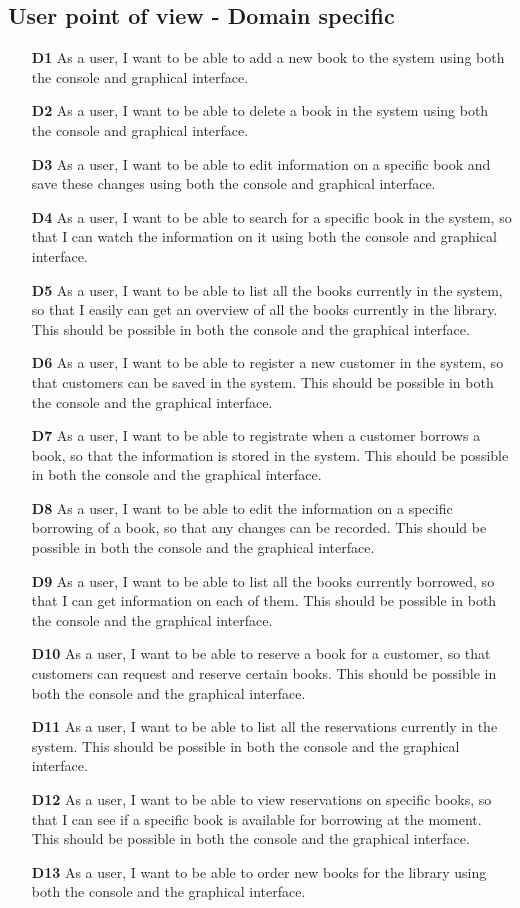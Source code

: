 \subsection*{User point of view - Domain specific}
\begin{itemize}
  \item [\textbf{D1}] As a user, I want to be able to add a new book to the system using both the console and graphical interface.
  \item [\textbf{D2}] As a user, I want to be able to delete a book in the system using both the console and graphical interface.
  \item [\textbf{D3}] As a user, I want to be able to edit information on a specific book and save these changes using both the console and graphical interface.
  \item [\textbf{D4}] As a user, I want to be able to search for a specific book in the system, so that I can watch the information on it using both the console and graphical interface.
  \item [\textbf{D5}] As a user, I want to be able to list all the books currently in the system, so that I easily can get an overview of all the books currently in the library. This should be possible in both the console and the graphical interface.
  \item [\textbf{D6}] As a user, I want to be able to register a new customer in the system, so that customers can be saved in the system. This should be possible in both the console and the graphical interface.
  \item [\textbf{D7}] As a user, I want to be able to registrate when a customer borrows a book, so that the information is stored in the system. This should be possible in both the console and the graphical interface.
  \item [\textbf{D8}] As a user, I want to be able to edit the information on a specific borrowing of a book, so that any changes can be recorded. This should be possible in both the console and the graphical interface.
  \item [\textbf{D9}] As a user, I want to be able to list all the books currently borrowed, so that I can get information on each of them. This should be possible in both the console and the graphical interface.
  \item [\textbf{D10}] As a user, I want to be able to reserve a book for a customer, so that customers can request and reserve certain books. This should be possible in both the console and the graphical interface.
  \item [\textbf{D11}] As a user, I want to be able to list all the reservations currently in the system. This should be possible in both the console and the graphical interface.
  \item [\textbf{D12}] As a user, I want to be able to view reservations on specific books, so that I can see if a specific book is available for borrowing at the moment. This should be possible in both the console and the graphical interface.
  \item [\textbf{D13}] As a user, I want to be able to order new books for the library using both the console and the graphical interface.
\end{itemize}


